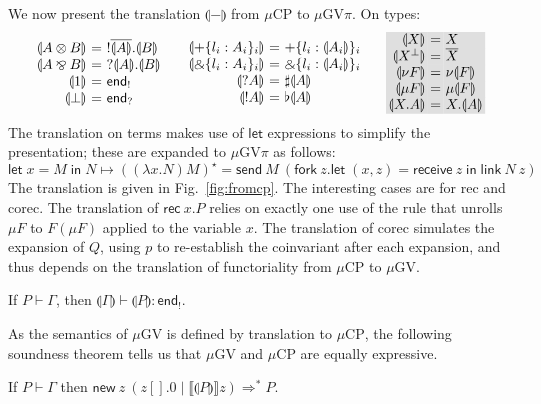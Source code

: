 \documentclass[orivec,envcountsame]{llncs}
\makeatletter
\newcommand{\with}{\mathbin\binampersand}
\newcommand{\parr}{\mathbin\bindnasrepma}
\newcommand{\cpdual}[1]{#1^\perp}
\newcommand{\cpbang}[1]{{! #1}}
\newcommand{\cpquery}[1]{{? #1}}
\newcommand{\gvdual}[1]{\overline{#1}}
\newcommand{\gvout}[2]{{!#1.#2}}
\newcommand{\gvin}[2]{{?#1.#2}}
\newcommand{\outterm}{\mkwd{end}_!}
\newcommand{\interm}{\mkwd{end}_?}
\newcommand{\gvserver}[1]{\flat #1}
\newcommand{\gvservice}[1]{\sharp #1}
\newcommand{\cptyp}[2]{#1 \vdash #2}
\newcommand{\gvtyp}[3]{#1 \vdash #2 : #3}
\newcommand{\mkwd}[1]{\mathsf{#1}}
\newcommand{\tkwd}[1]{\textsf{#1}}
\newcommand{\cut}[4]{\mkwd{new}\:#1 \: (#3 \mid #4)}
\newcommand{\rec}[1]{\mkwd{rec}\:#1}
\newcommand{\gvsend}[2]{\mkwd{send}\:#1\:#2}
\newcommand{\gvreceive}[1]{\mkwd{receive}\:#1}
\newcommand{\gvlet}[3]{\mkwd{let}\;#1 = #2\;\mkwd{in}\;#3}
\newcommand{\gvlink}[2]{\mkwd{link}\:#1\:#2}
\newcommand{\gvfork}[2]{\mkwd{fork}\:#1.#2}
\newcommand{\gvreceivek}[4]{\gvlet{({#1}, {#2})}{\gvreceive{#3}}{#4}}
\newcommand{\key}{\mkwd}
\newcommand{\tocp}[1]{\llbracket #1 \rrbracket}
\newcommand{\togv}[1]{\llparenthesis #1 \rrparenthesis}
\newcommand{\topi}[1]{({#1})^\star}
\newcommand{\mucp}{$\mu\mathrm{CP}$\xspace}
\newcommand{\mugv}{$\mu\mathrm{GV}$\xspace}
\newcommand{\gvpi}{$\mu\mathrm{GV}\pi$\xspace}
\newcommand{\ba}{\begin{array}}
\newcommand{\ea}{\end{array}}
\newenvironment{eqs}{\ba{@{}r@{~}c@{~}l@{}}}{\ea}
\newcommand\shaderow{\noalign{\vskip-0.4pt}\rowcolor{shade}[0.6mm]}
\makeatother
\begin{document}
We now present the translation $\togv{-}$ from \mucp to \gvpi. On types:
\small\[
\ba{@{}c@{\qquad}c@{\qquad}c@{}}
\begin{eqs}
\togv{A \otimes B} &=& \gvout{\gvdual{\togv{A}}}{\togv{B}} \\
\togv{A \parr B}   &=& \gvin{\togv{A}}{\togv{B}} \\
\togv{1}           &=& \outterm \\
\togv{\bot}        &=& \interm \\
\end{eqs}
&
\begin{eqs}
\togv{+\{l_i:A_i\}_i}     &=& +\{l_i:\togv{A_i}\}_i  \\
\togv{\with\{l_i:A_i\}_i} &=& \with\{l_i:\togv{A_i}\}_i \\
\togv{\cpquery{A}}  &=& \gvservice{\togv{A}} \\
\togv{\cpbang{A}}   &=& \gvserver{\togv{A}} \\
\end{eqs}
&
\begin{eqs}\shaderow
\togv{X}           &=& X \\ \shaderow
\togv{\cpdual{X}}  &=& \gvdual{X} \\ \shaderow
\togv{\nu F} &=& \nu \togv{F} \\ \shaderow
\togv{\mu F} &=& \mu \togv{F} \\ \shaderow
\togv{X.A} &=& X.\togv{A} \\
\end{eqs}
\ea
\]\normalsize
The translation on terms makes use of $\key{let}$ expressions to simplify the presentation; these
are expanded to \gvpi as follows:
\small\[
\gvlet{x}{M}{N} \mapsto
  \topi{(\lambda x.N) M} =
  \gvsend{M}{(\gvfork{z}{\gvreceivek{x}{z}{z}{\gvlink{N}{z}}})}
\]\normalsize%
The translation is given in Fig.~\ref{fig:fromcp}. The interesting cases are for \tkwd{rec} and
\tkwd{corec}. The translation of $\rec{x}.P$ relies on exactly one use of the rule that unrolls $\mu
F$ to $F (\mu F)$ applied to the variable $x$.
The translation of \tkwd{corec} simulates the expansion of $Q$, using $p$ to re-establish the
coinvariant after each expansion, and thus depends on the translation of functoriality from \mucp to
\mugv.

\begin{theorem}
  If $\cptyp{P}{\Gamma}$, then $\gvtyp{\togv{\Gamma}}{\togv{P}}{\outterm}$.
\end{theorem}
%
%
As the semantics of \mugv is defined by translation to \mucp, the following soundness theorem tells
us that \mugv and \mucp are equally expressive.
\begin{theorem}
\label{th:soundness}
If $\cptyp{P}{\Gamma}$ then $\cut{z}{}{z[].0}{\tocp{\togv{P}}z} \Longrightarrow^* P$.
\end{theorem}
%
\end{document}
